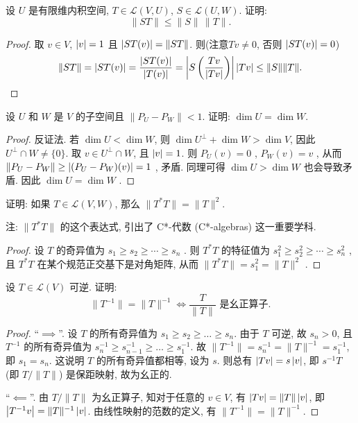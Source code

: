 \documentclass{article}
\begin{document}
\begin{problem}[7F-5]
设 $U$ 是有限维内积空间, $T \in \mathcal{L}(V, U)$, $S \in \mathcal{L}(U, W)$. 证明:
\[
\|S T\| \le \|S\| \, \|T\|.
\]
\end{problem}

\begin{proof}
  取 \( v\in V \), \( \left|v\right|=1 \) 且 \( \left|ST(v)\right|=\|ST\| \). 则(注意\( Tv\neq 0 \), 否则 \( \left|ST(v)\right|=0 \))
  \[ \|ST\|=\left|ST(v)\right|=\frac{\left|ST(v)\right|}{\left|T(v)\right|}=\left|S\left( \frac{Tv}{\left|Tv\right|} \right)\right|\left|Tv\right|\le \|S\|\|T\|. \]
\end{proof}



\begin{problem}[7F-14]
设 $U$ 和 $W$ 是 $V$ 的子空间且 $\|P_U - P_W\| < 1$. 证明: $\dim U = \dim W$.
\end{problem}

\begin{proof}
  反证法. 若 \( \dim U<\dim W \), 则 \( \dim U^\perp+\dim W>\dim V \), 因此 \( U^\perp\cap W\neq\{0\} \). 取 \( v\in U^\perp\cap W \), 且 \( \left|v\right|=1 \). 则 \( P_U(v)=0 \) , \( P_W(v)=v \) , 从而 \( \|P_U-P_W\|\ge\left|(P_U-P_W)(v)\right|=1 \) , 矛盾. 同理可得 \( \dim U>\dim W \) 也会导致矛盾. 因此 \( \dim U=\dim W \) .
\end{proof}



\begin{problem}[7F-19]
证明: 如果 $T \in \mathcal{L}(V, W)$, 那么 $\|T^* T\| = \|T\|^2$.

注: $\|T^* T\|$ 的这个表达式, 引出了 C*-代数 (C*-algebras) 这一重要学科.
\end{problem}

\begin{proof}
  设 \( T \) 的奇异值为 \( s_1\ge s_2\ge \cdots \ge s_n \) . 则 \( T^*T \) 的特征值为 \( s_1^2\ge s_2^2\ge \cdots \ge s_n^2 \) , 且 \( T^*T \) 在某个规范正交基下是对角矩阵, 从而 \( \|T^*T\|=s_1^2=\|T\|^2 \) .
\end{proof}



\begin{problem}[7F-24]
设 $T \in \mathcal{L}(V)$ 可逆. 证明:
\[
\|T^{-1}\| = \|T\|^{-1} \Longleftrightarrow \frac{T}{\|T\|} \text{ 是幺正算子}.
\]
\end{problem}

\begin{proof}
  ``\( \implies \)''. 设 \( T \) 的所有奇异值为 \( s_1\ge s_2\ge\dots\ge s_n \). 由于 \( T \) 可逆, 故 \( s_n>0 \), 且 \( T^{-1} \) 的所有奇异值为 \( s_n^{-1}\ge s_{n-1}^{-1}\ge\dots\ge s_1^{-1} \). 故 \( \|T^{-1}\|=s_n^{-1}=\|T\|^{-1}=s_1^{-1} \), 即 \( s_1=s_n \). 这说明 \( T \) 的所有奇异值都相等, 设为 \( s \). 则总有 \( \left|Tv\right|=s\left|v\right| \), 即 \( s^{-1}T \) (即 \( T/\|T\| \)) 是保距映射, 故为幺正的.

  ``\( \impliedby \)''. 由 \( T/\|T\| \) 为幺正算子, 知对于任意的 \( v\in V \), 有 \( \left|Tv\right|=\|T\|\left|v\right| \), 即 \( \left|T^{-1}v\right|=\|T\|^{-1}\left|v\right| \). 由线性映射的范数的定义, 有 \( \|T^{-1}\|=\|T\|^{-1} \). 
\end{proof}
\end{document}
